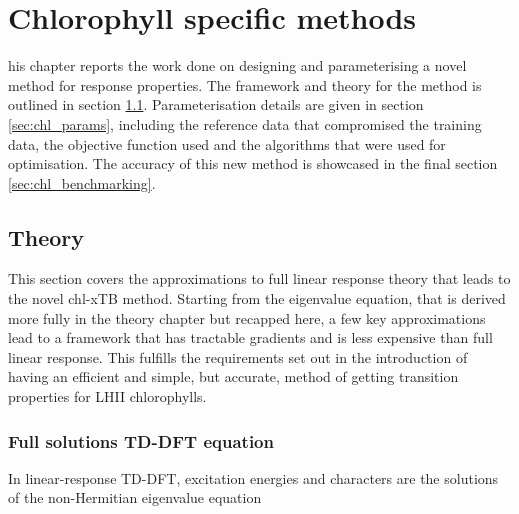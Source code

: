 %
%
\let\textcircled=\pgftextcircled
\chapter{Chlorophyll specific methods}
\label{chap:chl_xtb}

his chapter reports the work done on designing and parameterising a
novel method for response properties. The framework and theory for the method is
outlined in section \ref{sec:theory}. Parameterisation details are given in 
section \ref{sec:chl_params}, including the reference data that compromised the 
training data, the objective function used and the algorithms that were used for
optimisation. The accuracy of this new method is showcased in the final section 
\ref{sec:chl_benchmarking}.

\section{Theory}
\label{sec:theory}

This section covers the approximations to full linear response theory that leads to the 
novel chl-xTB method. Starting from the eigenvalue equation, that is derived more
fully in the theory chapter but recapped here, a few key approximations lead to 
a framework that has tractable gradients and is less expensive than full linear
response. This fulfills the requirements set out in the introduction of having
an efficient and simple, but accurate, method of getting transition properties
for LHII chlorophylls.

\subsection{Full solutions TD-DFT equation}
In linear-response TD-DFT, excitation energies and characters are the solutions
of the non-Hermitian eigenvalue equation

